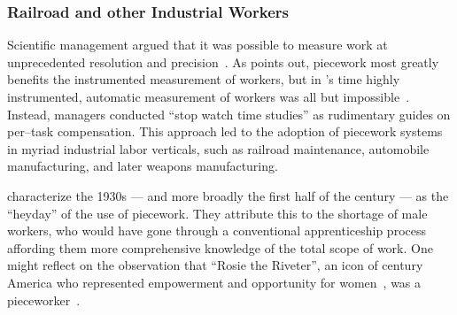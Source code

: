 \documentclass[trackingWork]{subfiles}
\begin{document}
\subsubsection{Railroad and other Industrial Workers}
Scientific management argued that it was possible to measure work at
unprecedented resolution and precision~\cite{taylor1914principles,towardsGlobalFordism}.
As \citeauthor{Brown01041990} points out,
piecework most greatly benefits the instrumented measurement of workers,
but in \citeauthor{taylor1914principles}'s time highly instrumented,
automatic measurement of workers was all but impossible~\cite{Brown01041990}.
Instead, managers conducted ``stop watch time studies'' \cite{nadworny1955scientific}
as rudimentary guides on per--task compensation.
This approach led to the adoption of piecework systems in myriad industrial labor verticals, such as
railroad maintenance, automobile manufacturing, and later weapons manufacturing.




\citeauthor{hart2013rise} characterize the 1930s
--- and more broadly the first half of the  century ---
as the ``heyday'' of the use of piecework.
They attribute this to the shortage of male workers,
who would have gone through a conventional apprenticeship process
affording them more comprehensive knowledge of the total scope of work.
One might reflect on the observation that ``Rosie the Riveter'',
an icon of  century America who
represented empowerment and opportunity for women~\cite{honey1985creating},
was a pieceworker~\cite{davies2014origins}.







\onlyinsubfile{
  \printbibliography
  }
\end{document}
